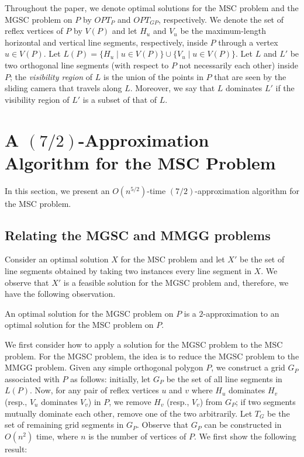 \documentclass{llncs}
\begin{document}
Throughout the paper, we denote optimal solutions for the MSC problem and the MGSC problem on $P$ by
$OPT_P$ and $OPT_{GP}$, respectively.
We denote the set of reflex vertices of $P$
by $V(P)$ and let $H_u$ and $V_u$ be the maximum-length
horizontal and vertical line segments, respectively, inside $P$ through a vertex
$u\in V(P)$. Let $L(P)=\{H_u\mid u\in V(P)\}\cup\{V_u\mid u\in V(P)\}$.
Let $L$ and $L'$ be two
orthogonal line segments (with respect to $P$ not necessarily each other) inside $P$; the \emph{visibility region} of $L$ is the union
of the points in $P$ that are seen by the sliding camera that travels along $L$. Moreover,
we say that $L$ dominates $L'$ if the visibility
region of $L'$ is a subset of that of $L$.

\section{A \boldmath$(7/2)$-Approximation Algorithm for the MSC Problem}
\label{sec:3approxAlgorithm}In this section, we present an $O(n^{5/2})$-time $(7/2)$-approximation algorithm for the MSC problem.



\subsection{Relating the MGSC and MMGG problems}
Consider an optimal solution $X$ for the MSC problem and let
$X'$ be the set of line segments obtained by taking two instances every line segment in $X$. We
observe that $X'$ is a feasible solution for the MGSC problem and, therefore, we have
the following observation.
\begin{observation}
\label{obs:mgscAndMSC}
An optimal solution for the MGSC problem on $P$ is a $2$-approximation to an
optimal solution for the MSC problem on $P$.
\end{observation}

We first consider how to apply a solution for the MGSC problem to the MSC problem.
For the MGSC problem, the idea is to reduce the MGSC problem to the MMGG problem.
Given any simple orthogonal polygon $P$, 
we construct a grid $G_P$ associated with $P$ as follows: initially, let $G_P$ be the
set of all line segments in $L(P)$. Now, for any pair of reflex vertices
$u$ and $v$ where $H_u$ dominates $H_v$ (resp., $V_u$ dominates $V_v$) in $P$, we remove
$H_v$ (resp., $V_v$) from $G_P$; if two segments mutually dominate each other, remove
one of the two arbitrarily. Let $T_G$ be the set of remaining grid segments in $G_P$. Observe that $G_P$
can be constructed in $O(n^2)$ time, where $n$ is the number of vertices of $P$. We first show the following result:
\end{document}

